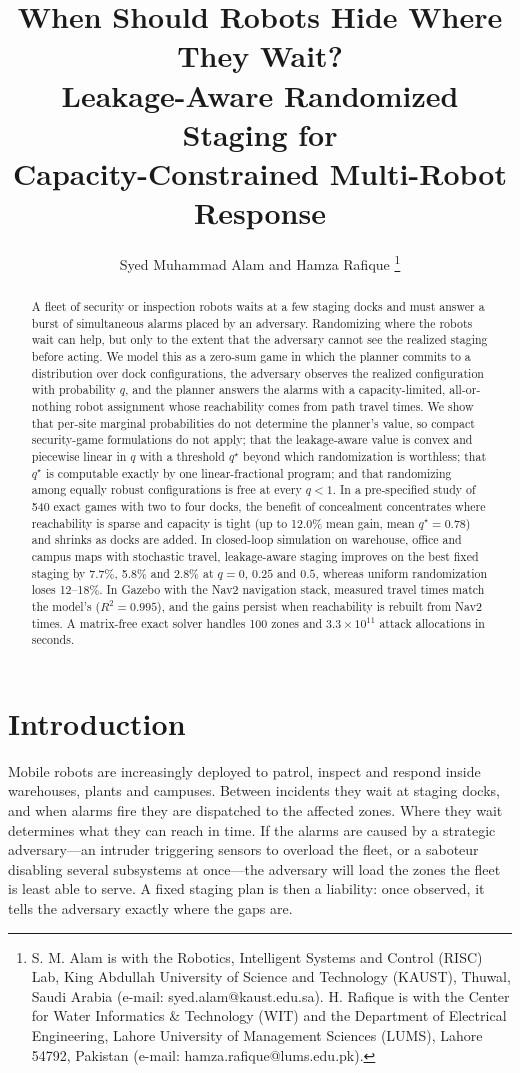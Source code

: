 \documentclass[10pt,twocolumn,letterpaper]{article}
\title{\Large When Should Robots Hide Where They Wait?\\ Leakage-Aware Randomized Staging for\\ Capacity-Constrained Multi-Robot Response}
\author{Syed Muhammad Alam and Hamza Rafique%
\thanks{S. M. Alam is with the Robotics, Intelligent Systems and Control (RISC) Lab, King Abdullah University of Science and Technology (KAUST), Thuwal, Saudi Arabia (e-mail: syed.alam@kaust.edu.sa). H. Rafique is with the Center for Water Informatics \& Technology (WIT) and the Department of Electrical Engineering, Lahore University of Management Sciences (LUMS), Lahore 54792, Pakistan (e-mail: hamza.rafique@lums.edu.pk).}}
\date{}
\theoremstyle{remark}
\begin{document}
\maketitle

\begin{abstract}
A fleet of security or inspection robots waits at a few staging docks and must answer a burst of simultaneous alarms placed by an adversary. Randomizing where the robots wait can help, but only to the extent that the adversary cannot see the realized staging before acting. We model this as a zero-sum game in which the planner commits to a distribution over dock configurations, the adversary observes the realized configuration with probability $q$, and the planner answers the alarms with a capacity-limited, all-or-nothing robot assignment whose reachability comes from path travel times. We show that per-site marginal probabilities do not determine the planner's value, so compact security-game formulations do not apply; that the leakage-aware value is convex and piecewise linear in $q$ with a threshold $q^\star$ beyond which randomization is worthless; that $q^\star$ is computable exactly by one linear-fractional program; and that randomizing among equally robust configurations is free at every $q<1$. In a pre-specified study of 540 exact games with two to four docks, the benefit of concealment concentrates where reachability is sparse and capacity is tight (up to 12.0\% mean gain, mean $q^\star=0.78$) and shrinks as docks are added. In closed-loop simulation on warehouse, office and campus maps with stochastic travel, leakage-aware staging improves on the best fixed staging by 7.7\%, 5.8\% and 2.8\% at $q=0$, $0.25$ and $0.5$, whereas uniform randomization loses 12--18\%. In Gazebo with the Nav2 navigation stack, measured travel times match the model's ($R^2=0.995$), and the gains persist when reachability is rebuilt from Nav2 times. A matrix-free exact solver handles 100 zones and $3.3\times10^{11}$ attack allocations in seconds.
\end{abstract}

\section{Introduction}
Mobile robots are increasingly deployed to patrol, inspect and respond inside warehouses, plants and campuses. Between incidents they wait at staging docks, and when alarms fire they are dispatched to the affected zones. Where they wait determines what they can reach in time. If the alarms are caused by a strategic adversary---an intruder triggering sensors to overload the fleet, or a saboteur disabling several subsystems at once---the adversary will load the zones the fleet is least able to serve. A fixed staging plan is then a liability: once observed, it tells the adversary exactly where the gaps are.
\end{document}
